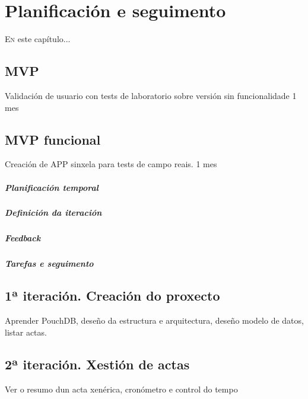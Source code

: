 \chapter{Planificación e seguimento}
\minitoc
\label{chap:Planificacioneseguimento}
\vspace{0.5cm}


  \lettrine{E}{n} este capítulo...

  \section{MVP}
  Validación de usuario con tests de laboratorio sobre versión sin funcionalidade
  1 mes

  \section{MVP funcional}
  Creación de APP sinxela para tests de campo reais.
  1 mes
    \paragraph{Planificación temporal}
    \paragraph{Definición da iteración}
    \paragraph{Feedback}
    \paragraph{Tarefas e seguimento}
  
  \section{1ª iteración. Creación do proxecto}
  Aprender PouchDB, deseño da estructura e arquitectura, deseño modelo de datos, listar 
actas.
  
  \section{2ª iteración. Xestión de actas}
  Ver o resumo dun acta xenérica, cronómetro e control do tempo 
  
